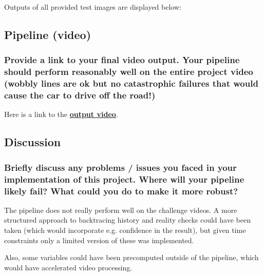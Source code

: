 \documentclass[a4paper,10pt]{article}
\begin{document}
Outputs of all provided test images are displayed below:
\subsection{Pipeline (video)}

\subsubsection{Provide a link to your final video output. Your pipeline should perform reasonably well on the entire project video 
(wobbly lines are ok but no catastrophic failures that would cause the car to drive off the road!)}

Here is a link to the \href{https://github.com/czechows/udacity----advanced-lane-lines/blob/master/output.mp4}{\textbf{output video}}.

\subsection{Discussion}

\subsubsection{Briefly discuss any problems / issues you faced in your implementation of this project. Where will your pipeline likely fail? What could you do to make it more robust?}

The pipeline does not really perform well on the challenge videos.
A more structured approach to backtracing history and reality checks could have been taken (which would incorporate e.g. confidence in the result),
but given time constraints only a limited version of these was implemented.

Also, some variables could have been precomputed outside of the pipeline, which would have accelerated video processing.
\end{document}
